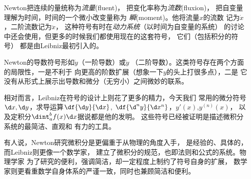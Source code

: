 \begin{shaded}
	Newton把连续的量统称为{\it 流量}(fluent)，
	把变化率称为{\it 流数}(fluxion)，
	把自变量理解为时间，时间的一个微小改变量称为
	{\it 瞬}(moment)。他将流量$x$的流数
	记为$\dot{x}$，二阶流数记为$\ddot{x}$，
	这种符号有时在{\it 动力系统}（以时间为自变量的系统）
	的讨论中还会使用，但更多的时候我们都使用现在的这套符号，
	它们（包括积分的符号）
	都是由Leibniz最初引入的。

	Newton的导数符号形如$\dot{y}$（一阶导数）或$\ddot{y}$
	（二阶导数）。这类符号存在两个方面的局限性，一是不利于
	向更高的阶数扩展（想象一下$y$的头上打很多点），二是
	它没有从形式上展示出导数和微分（无穷小）之间微妙的联系。

	相对而言，Leibniz在符号的设计上则花了更多的精力，今天我们
	常用的微分符号$\d x,\d y$，求导运算$\df{\d y}{\d x}$,
	$\df{\d^n y}{\d x^n}$，$y'(x)$,$y^{(n)}(x)$，
	以及定积分$\dint_a^bf(x)\d x$据说都是他的发明。
	这些符号已经被证明是描述微积分系统的最简洁、直观和
	有力的工具。

	有人说，Newton研究微积分是更偏重于从物理的角度入手，
	是经验的、具体的，而Leibniz则更像一个数学家，
	建立了微积分的规范，也即法则和公式的系统。物理学家
	为了研究的便利，强调简洁，却一定程度上制约了符号自身的扩展，
	数学家则更看重数学自身体系的严谨一致，同时也兼顾简洁和便利。
\end{shaded}


